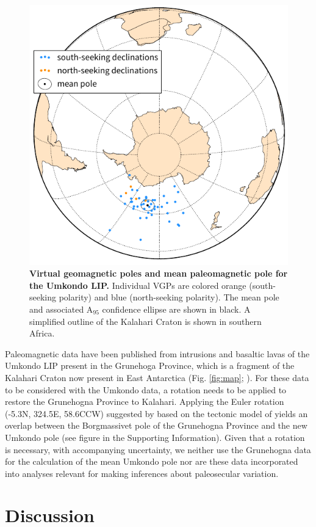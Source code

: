 \documentclass[11pt,letterpaper]{article}
\begin{document}
\begin{figure}[h!]
\includegraphics[width=9 cm]{figures/Umkondo_mean_pole.pdf}
\caption{\textbf{ Virtual geomagnetic poles and mean paleomagnetic pole for the Umkondo LIP.} Individual VGPs are colored orange (south-seeking polarity) and blue (north-seeking polarity). The mean pole and associated A$_{95}$ confidence ellipse are shown in black. A simplified outline of the Kalahari Craton is shown in southern Africa.}
\label{fig:pole}
\end{figure}

Paleomagnetic data have been published from intrusions and basaltic lavas of the Umkondo LIP present in the Grunehoga Province, which is a fragment of the Kalahari Craton now present in East Antarctica (Fig. \ref{fig:map}; \cite{Powell2001a,Jones2003a}). For these data to be considered with the Umkondo data, a rotation needs to be applied to restore the Grunehogna Province to Kalahari. Applying the Euler rotation (-5.3\textdegree N, 324.5\textdegree E, 58.6\textdegree CCW) suggested by \cite{Evans2009a} based on the tectonic model of \cite{Jacobs2004a} yields an overlap between the Borgmassivet pole of the Grunehogna Province \citep{Jones2003a} and the new Umkondo pole (see figure in the Supporting Information). Given that a rotation is necessary, with accompanying uncertainty, we neither use the Grunehogna data for the calculation of the mean Umkondo pole nor are these data incorporated into analyses relevant for making inferences about paleosecular variation.

\section*{Discussion}
\end{document}
